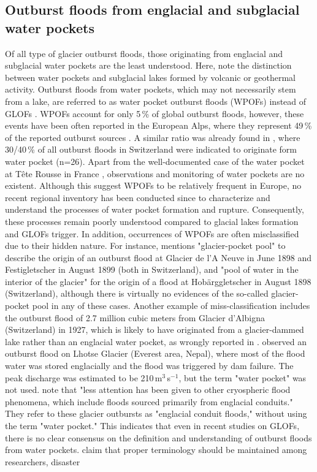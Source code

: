 \subsection{Outburst floods from englacial and subglacial water pockets} 
\label{subsection:glofs_water_pockets}

Of all type of glacier outburst floods, those originating from englacial and subglacial water pockets are the least understood. Here, note the distinction between water pockets and subglacial lakes formed by volcanic or geothermal activity. Outburst floods from water pockets, which may not necessarily stem from a lake, are referred to as water pocket outburst floods (WPOFs) instead of GLOFs \citep[as in][]{Deline&al2004}. WPOFs account for only 5\,\% of global outburst floods, however, these events have been often reported in the European Alps, where they represent 49\,\% of the reported outburst sources \citep{Lutzow&al2023}. A similar ratio was already found in \cite{Haeberli1983}, where 30/40\,\% of all outburst floods in Switzerland were indicated to originate form water pocket (n=26). Apart from the well-documented case of the water pocket at Tête Rousse in France \citep{Vincent&al2010b,Vincent&al2012}, observations and monitoring of water pockets are no existent. Although this suggest WPOFs to be relatively frequent in Europe, no recent regional inventory has been conducted since \cite{Haeberli1983} to characterize and understand the processes of water pocket formation and rupture. Consequently, these processes remain poorly understood compared to glacial lakes formation and GLOFs trigger. In addition, occurrences of WPOFs are often misclassified due to their hidden nature. For instance, \cite{Rabot1905} mentions "glacier-pocket pool" to describe the origin of an outburst flood at Glacier de l'A Neuve in June 1898 and Festigletscher in August 1899 (both in Switzerland), and "pool of water in the interior of the glacier" for the origin of a flood at Hobärggletscher in August 1898 (Switzerland), although there is virtually no evidences of the so-called glacier-pocket pool in any of these cases. Another example of miss-classification includes the outburst flood of 2.7 million cubic meters from Glacier d'Albigna (Switzerland) in 1927, which is likely to have originated from a glacier-dammed lake rather than an englacial water pocket, as wrongly reported in \cite{Lutzow&al2023}. \cite{Rounce&al2017} observed an outburst flood on Lhotse Glacier (Everest area, Nepal), where most of the flood water was stored englacially and the flood was triggered by dam failure. The peak discharge was estimated to be 210\,m$^3$\,s$^{-1}$, but the term "water pocket" was not used. \cite{Byers&al2022} note that "less attention has been given to other cryospheric flood phenomena, which include floods sourced primarily from englacial conduits." They refer to these glacier outbursts as "englacial conduit floods," without using the term "water pocket." This indicates that even in recent studies on GLOFs, there is no clear consensus on the definition and understanding of outburst floods from water pockets. \cite{Emmer&al2022} claim that proper terminology should be maintained among researchers, disaster 